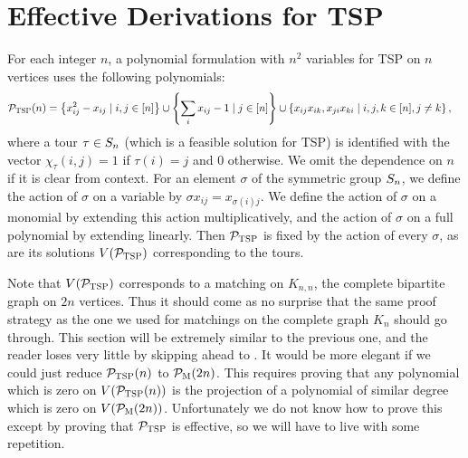 \section{Effective Derivations for \textsc{TSP}}

For each integer $n$, a polynomial formulation with $n^2$ variables for \textsc{TSP} on $n$ vertices uses the following polynomials:
\begin{align*}
\mathcal P_{\textsc{TSP}}(n) &= \left\{x_{ij}^2 - x_{ij} \mid i,j \in [n]\right\} \cup \left\{\sum_i x_{ij} - 1 \mid j \in [n]\right\} \cup \left\{x_{ij}x_{ik}, x_{ji}x_{ki} \mid i,j,k \in [n], j \neq k\right\},\label{eq:tsp-formulation}
\end{align*}
where a tour $\tau \in S_{n}$ (which is a feasible solution for \textsc{TSP}) is identified with the vector $\chi_\tau(i,j) = 1$ if $\tau(i) = j$ and $0$ otherwise. We omit the dependence on $n$ if it is clear from context. For an element $\sigma$ of the symmetric group $S_{n}$, we define the action of $\sigma$ on a variable by $\sigma x_{ij} = x_{\sigma(i)j}$.
We define the action of $\sigma$ on a monomial by extending this action multiplicatively, and the action of $\sigma$ on a full polynomial by extending linearly.
Then $\mathcal P_{\textsc{TSP}}$ is fixed by the action of every $\sigma$, as are its solutions $V(\mathcal P_{\textsc{TSP}})$ corresponding to the tours. 

Note that $V(\mathcal P_{\textsc{TSP}})$ corresponds to a matching on $K_{n,n}$, the complete bipartite graph on $2n$ vertices. Thus it should come as no surprise that the same proof strategy as the one we used for matchings on the complete graph $K_n$ should go through. This section will be extremely similar to the previous one, and the reader loses very little by skipping ahead to . It would be more elegant if we could just reduce $\mathcal P_{\textsc{TSP}}(n)$ to $\mathcal P_{\textsc{M}}(2n)$. This requires proving that any polynomial which is zero on $V(\mathcal P_{\textsc{TSP}}(n))$ is the projection of a polynomial of similar degree which is zero on $V(\mathcal P_{\textsc{M}}(2n))$. Unfortunately we do not know how to prove this except by proving that $\mathcal P_{\textsc{TSP}}$ is effective, so we will have to live with some repetition. 

